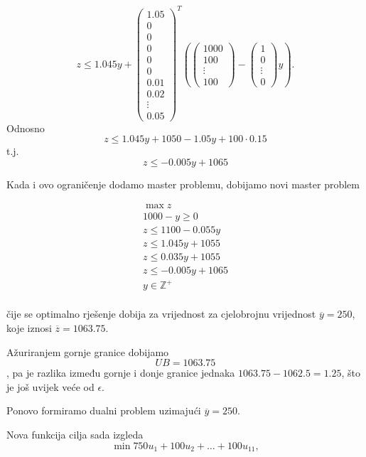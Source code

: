 \documentclass[a4paper, utf8, 11pt, colorlinks]{book}
\theoremstyle{definition}
\begin{document}
 
 $$z\leqslant 1.045y+\left(\begin{array}{c}
 	1.05\\
 0\\
 0\\
 0\\
 0\\
 0\\
 0.01 \\
 0.02 \\
 \vdots \\
 0.05
 \end{array}\right)^T
 \left(\left(\begin{array}{c}
 	1000 \\
 	100 \\
 	\vdots \\
 	100
 \end{array}\right)-\left(\begin{array}{c}
 	1 \\
 	0 \\
 	\vdots \\
 	0
 \end{array}\right)y\right).$$
 Odnosno 
 $$z\leqslant 1.045y+1050-1.05y+100\cdot0.15$$
 t.j.
 $$z\leqslant -0.005y+1065$$
 
 
 Kada i ovo ograničenje dodamo master problemu, dobijamo novi master problem
 
 $$
 \begin{aligned}
 	\max z\\
 	1000-y\geqslant 0\\
 	z\leqslant 1100-0.055y\\ 
 	z\leqslant 1.045y+1055\\
 	z\leqslant 0.035y+1055\\
 	z\leqslant -0.005y+1065\\
 	y\in\mathbb{Z}^+\\	
 \end{aligned}
 $$
 
 
 
 čije se optimalno rješenje dobija za vrijednost za cjelobrojnu vrijednost $\overline{y}=250$, koje iznosi $\overline{z} = 1063.75$.
 
 Ažuriranjem gornje granice dobijamo 
 $$UB = 1063.75$$, pa je razlika između gornje i donje granice jednaka
 $1063.75-1062.5=1.25$, što je još uvijek veće od $\epsilon$.
 
Ponovo formiramo dualni problem uzimajući $\overline{y}=250$.
 
 Nova funkcija cilja sada izgleda
 $$\min 750u_1+ 100u_2+\ldots+100u_{11},$$
 
\end{document}
